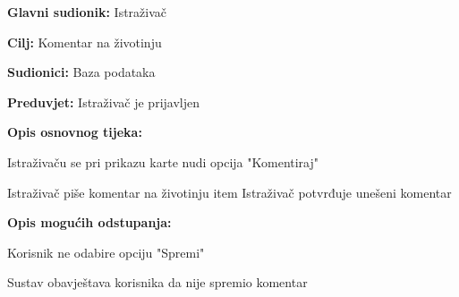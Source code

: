 				\noindent {}
				\begin{packed_item}
					
					\item \textbf{Glavni sudionik:} Istraživač
					\item  \textbf{Cilj:} Komentar na životinju
					\item  \textbf{Sudionici:} Baza podataka
					\item  \textbf{Preduvjet:} Istraživač je prijavljen
					\item  \textbf{Opis osnovnog tijeka:}
					
					\item[] \begin{packed_enum}
						
						\item Istraživaču se pri prikazu karte nudi opcija "Komentiraj"
					
						\item Istraživač piše komentar na životinju
						item Istraživač potvrđuje unešeni komentar
						
						
					\end{packed_enum}
					
					\item  \textbf{Opis mogućih odstupanja:}
				
				\item[] \begin{packed_item}
					
					\item[4.a]Korisnik ne odabire opciju "Spremi"
					\item[] \begin{packed_enum}
						
						\item Sustav obavještava korisnika da nije spremio komentar
						
					\end{packed_enum}
					
				\end{packed_item}
						
				\end{packed_item}
				
					
				

